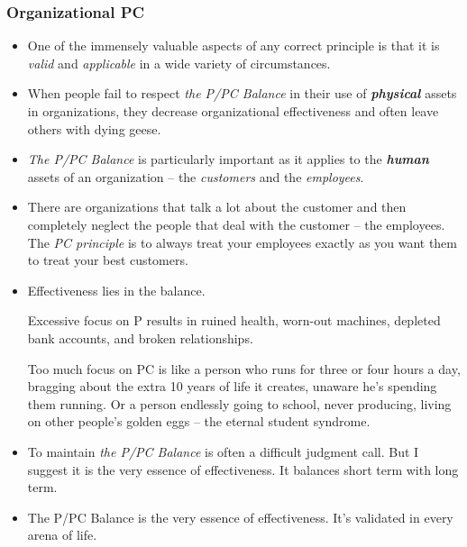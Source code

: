 \documentclass[11pt]{article}
\begin{document}
\subsubsection{Organizational PC}
\begin{itemize}
\item One of the immensely valuable aspects of any correct principle is that it is \emph{valid} and \emph{applicable} in a wide variety of circumstances. 

\item When people fail to respect \emph{the P/PC Balance} in their use of \emph{\textbf{physical}} assets in organizations, they decrease organizational effectiveness and often leave others with dying geese.

\item \emph{The P/PC Balance} is particularly important as it applies to the \emph{\textbf{human}} assets of an organization -- the \emph{customers} and the \emph{employees}.

\item There are organizations that talk a lot about the customer and then completely neglect the people that deal with the customer -- the employees. The \emph{PC principle} is to always treat your employees exactly as you want them to treat your best customers.

\item Effectiveness lies in the balance. 

Excessive focus on P results in ruined health, worn-out machines, depleted bank accounts, and broken relationships. 

Too much focus on PC is like a person who runs for three or four hours a day, bragging about the extra 10 years of life it creates, unaware he's spending them running. Or a person endlessly going to school, never producing, living on other people's golden eggs -- the eternal student syndrome.

\item To maintain \emph{the P/PC Balance} is often a difficult judgment call. But I suggest it is the very essence of effectiveness. It balances short term with long term. 

\item The P/PC Balance is the very essence of effectiveness. It's validated in every arena of life. 
\end{itemize}
\end{document}
